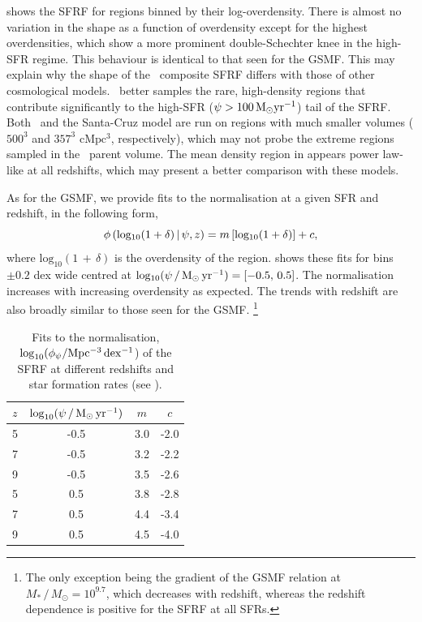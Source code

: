  shows the SFRF for regions binned by their log-overdensity.
There is almost no variation in the shape as a function of overdensity except for the highest overdensities, which show a more prominent double-Schechter knee in the high-SFR regime.
This behaviour is identical to that seen for the GSMF.
This may explain why the shape of the \flares\ composite SFRF differs with those of other cosmological models.
\flares\ better samples the rare, high-density regions that contribute significantly to the high-SFR ($\psi > 100 \, \mathrm{M_{\odot} yr^{-1}}$) tail of the SFRF.
Both \bluetides\ and the Santa-Cruz model are run on regions with much smaller volumes ($500^{3}$ and $357^{3}$ $\mathrm{cMpc^3}$, respectively), which may not probe the extreme regions sampled in the \flares\ parent volume.
The mean density region in  appears power law-like at all redshifts, which may present a better comparison with these models.


As for the GSMF, we provide fits to the normalisation at a given SFR and redshift, in the following form,
\begin{equation}
  \phi \,(\mathrm{log_{10}}(1+\delta) \,|\, \psi, z) = m \,[\mathrm{log_{10}}(1+\delta)] + c,
\end{equation}
where $\mathrm{log_{10}}(1\,+\,\delta)$ is the overdensity of the region.
 shows these fits for bins $\pm 0.2$ \; dex wide centred at $\mathrm{log_{10}(\psi\,/\,M_{\odot} \, yr^{-1})} = [-0.5,\,0.5]$.
The normalisation increases with increasing overdensity as expected.
The trends with redshift are also broadly similar to those seen for the GSMF.
\footnote{The only exception being the gradient of the GSMF relation at $M_{*} \,/\,M_{\odot} = 10^{9.7}$, which decreases with redshift,  whereas the redshift dependence is positive for the SFRF at all SFRs.}


\begin{table}
	\centering
	\caption{Fits to the normalisation, $\log_{10}(\phi_\psi/\mathrm{Mpc^{-3} \, dex^{-1}}$) of the SFRF at different redshifts and star formation rates (see \protect{}).}
	\label{tab:norm_SFRF}
	\begin{tabular}{lccc} %
		\hline
		$z$ & $\log_{10}(\psi \,/\, \mbox{M$_\odot$} \, \mathrm{yr}^{-1})$ & $m$ & $c$ \\
		\hline
        5 & -0.5 & 3.0 & -2.0 \\
        7 & -0.5 & 3.2 & -2.2 \\
        9 & -0.5 & 3.5 & -2.6 \\
        5 & 0.5 & 3.8 & -2.8 \\
        7 & 0.5 & 4.4 & -3.4 \\
        9 & 0.5 & 4.5 & -4.0 \\
        \hline
	\end{tabular}
\end{table}
